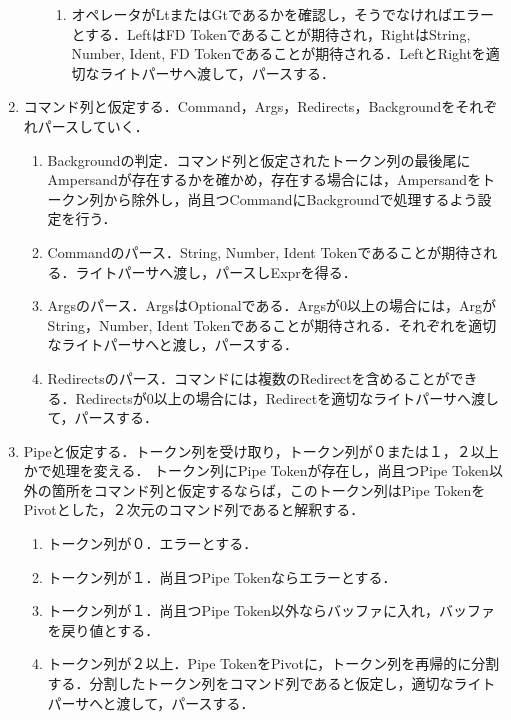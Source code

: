\documentclass{article}
\begin{document}
\begin{enumerate}
\begin{enumerate}
\begin{enumerate}
            \item オペレータがLtまたはGtであるかを確認し，そうでなければエラーとする．LeftはFD Tokenであることが期待され，RightはString, Number, Ident, FD Tokenであることが期待される．LeftとRightを適切なライトパーサへ渡して，パースする．
        \end{enumerate}
    \end{enumerate}
    \item コマンド列と仮定する．Command，Args，Redirects，Backgroundをそれぞれパースしていく．
    \begin{enumerate}
        \item Backgroundの判定．コマンド列と仮定されたトークン列の最後尾にAmpersandが存在するかを確かめ，存在する場合には，Ampersandをトークン列から除外し，尚且つCommandにBackgroundで処理するよう設定を行う．
        \item Commandのパース．String, Number, Ident Tokenであることが期待される．ライトパーサへ渡し，パースしExprを得る．
        \item Argsのパース．ArgsはOptionalである．Argsが0以上の場合には，ArgがString，Number, Ident Tokenであることが期待される．それぞれを適切なライトパーサへと渡し，パースする．
        \item Redirectsのパース．コマンドには複数のRedirectを含めることができる．Redirectsが0以上の場合には，Redirectを適切なライトパーサへ渡して，パースする．
    \end{enumerate}
    \item Pipeと仮定する．トークン列を受け取り，トークン列が０または１，２以上かで処理を変える．\newline
    トークン列にPipe Tokenが存在し，尚且つPipe Token以外の箇所をコマンド列と仮定するならば，このトークン列はPipe TokenをPivotとした，２次元のコマンド列であると解釈する．
    \begin{enumerate}
        \item トークン列が０．エラーとする．
        \item トークン列が１．尚且つPipe Tokenならエラーとする．
        \item トークン列が１．尚且つPipe Token以外ならバッファに入れ，バッファを戻り値とする．
        \item トークン列が２以上．Pipe TokenをPivotに，トークン列を再帰的に分割する．分割したトークン列をコマンド列であると仮定し，適切なライトパーサへと渡して，パースする．
    \end{enumerate}
\end{enumerate}
\end{document}

